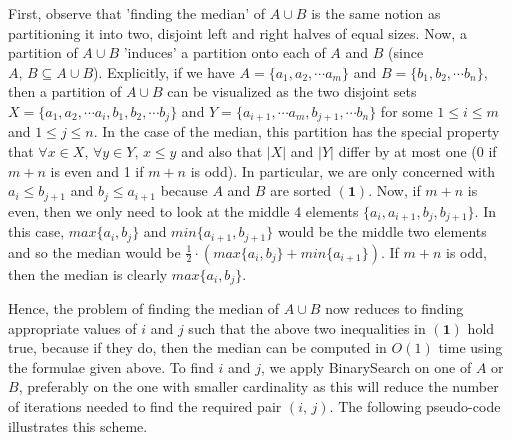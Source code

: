 \documentclass[tikz, letterpaper,12pt]{article}
\begin{document}
First, observe that 'finding the median' of $A\cup B$ is the same notion as partitioning it into two, disjoint left and right halves of equal sizes. Now, a partition of $A\cup B$ 'induces' a partition onto each of $A$ and $B$ (since $A,\,B\subseteq A\cup B$). Explicitly, if we have $A=\{a_1,a_2,\cdots a_m\}$ and $B=\{b_1,b_2,\cdots b_n\}$, then a partition of $A\cup B$ can be visualized as the two disjoint sets $X=\{a_1,a_2,\cdots a_i, b_1, b_2,\cdots b_j\}$ and $Y=\{a_{i+1},\cdots a_m, b_{j+1},\cdots b_n\}$ for some $1\leq i\leq m$ and $1\leq j\leq n$. In the case of the median, this partition has the special property that $\forall x\in X,\, \forall y\in Y,\, x\leq y$ and also that $|X|$ and $|Y|$ differ by at most one (0 if $m+n$ is even and 1 if $m+n$ is odd). In particular, we are only concerned with $a_i\leq b_{j+1}$ and $b_j\leq a_{i+1}$ because $A$ and $B$ are sorted $\bm{(1)}$. Now, if $m+n$ is even, then we only need to look at the middle 4 elements $\{a_i, a_{i+1}, b_j, b_{j+1}\}$. In this case, $max\{a_i, b_j\}$ and $min\{a_{i+1}, b_{j+1}\}$ would be the middle two elements and so the median would be $\frac{1}{2}\cdot (max\{a_i, b_j\}+min\{a_{i+1}\})$. If $m+n$ is odd, then the median is clearly $max\{a_i, b_j\}$.

Hence, the problem of finding the median of $A\cup B$ now reduces to finding appropriate values of $i$ and $j$ such that the above two inequalities in $\bm{(1)}$ hold true, because if they do, then the median can be computed in $O(1)$ time using the formulae given above. To find $i$ and $j$, we apply BinarySearch on one of $A$ or $B$, preferably on the one with smaller cardinality as this will reduce the number of iterations needed to find the required pair $(i,\,j)$. The following pseudo-code illustrates this scheme.
\end{document}
